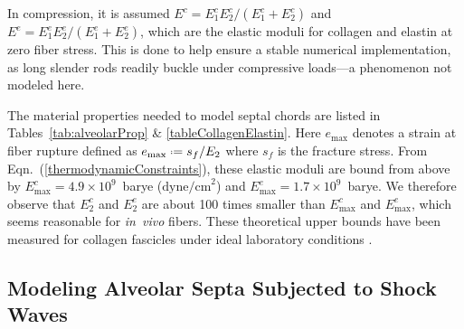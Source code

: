 In compression, it is assumed $E^c = E^c_1 E^c_2 / ( E^c_1 + E^c_2 )$ and $E^e = E^e_1 E^e_2 / ( E^e_1 + E^e_2 )$, which are the elastic moduli for collagen and elastin at zero fiber stress.  This is done to help ensure a stable numerical implementation, as long slender rods readily buckle under compressive loads---a phenomenon not modeled here.

The material properties needed to model septal chords are listed in Tables~\ref{tab:alveolarProp} \& \ref{tableCollagenElastin}.  Here $e_{\max}$ denotes a strain at fiber rupture defined as $e_{\max} \defeq s_f / E_2$ where $s_f$ is the fracture stress.  From Eqn.~(\ref{thermodynamicConstraints}), these elastic moduli are bound from above by $E^c_{\max} = 4.9 \times 10^9$~barye ($\text{dyne/cm}^2$) and $E^e_{\max} = 1.7 \times 10^9$~barye.  We therefore observe that $E^c_2$ and $E^e_2$ are about 100 times smaller than $E^c_{\max}$ and $E^e_{\max}$, which seems reasonable for \textit{in~vivo\/} fibers.  These theoretical upper bounds have been measured for collagen fascicles under ideal laboratory conditions \cite{Svenssonetal10}.

\subsection{Modeling Alveolar Septa Subjected to Shock Waves}
\label{secConjugatePairs}


